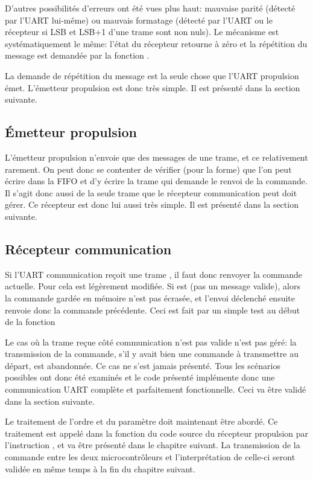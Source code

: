 D'autres possibilités d'erreurs ont été vues plus haut: mauvaise parité (détecté par l'UART lui-même) ou mauvais formatage (détecté par l'UART ou le récepteur si LSB et LSB+1 d'une trame sont non nuls). Le mécanisme est systématiquement le même: l'état du récepteur retourne à zéro et la répétition du message est demandée par la fonction .

La demande de répétition du message est la seule chose que l'UART propulsion émet. L'émetteur propulsion est donc très simple. Il est présenté dans la section suivante.

\subsection{\'Emetteur propulsion}
L'émetteur propulsion n'envoie que des messages de une trame, et ce relativement rarement. On peut donc se contenter de vérifier (pour la forme) que l'on peut écrire dans la FIFO et d'y écrire la trame  qui demande le renvoi de la commande. Il s'agit donc aussi de la seule trame que le récepteur communication peut doit gérer. Ce récepteur est donc lui aussi très simple. Il est présenté dans la section suivante.

\subsection{Récepteur communication}
Si l'UART communication reçoit une trame , il faut donc renvoyer la commande actuelle. Pour cela  est légèrement modifiée. Si  est  (pas un message valide), alors la commande gardée en mémoire n'est pas écrasée, et l'envoi déclenché ensuite renvoie donc la commande précédente. Ceci est fait par un simple test au début de la fonction 

Le cas où la trame reçue côté communication n'est pas valide n'est pas géré: la transmission de la commande, s'il y avait bien une commande à transmettre au départ, est abandonnée. Ce cas ne s'est jamais présenté. Tous les scénarios possibles ont donc été examinés et le code présenté implémente donc une communication UART complète et parfaitement fonctionnelle. Ceci va être validé dans la section suivante.

Le traitement de l'ordre et du paramètre doit maintenant être abordé. Ce traitement est appelé dans la fonction  du code source du récepteur propulsion par l'instruction , et va être présenté dans le chapitre suivant. La transmission de la commande entre les deux microcontrôleurs et l'interprétation de celle-ci seront validée en même temps à la fin du chapitre suivant.